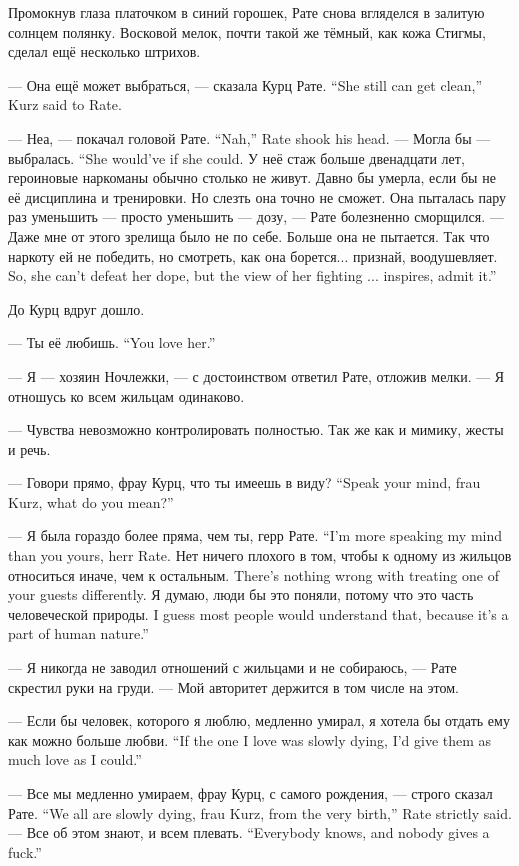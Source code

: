 Промокнув глаза платочком в синий горошек, Рате снова вгляделся в залитую солнцем полянку.
Восковой мелок, почти такой же тёмный, как кожа Стигмы, сделал ещё несколько штрихов.

{--- Она ещё может выбраться, --- сказала Курц Рате.}
{``She still can get clean,'' Kurz said to Rate.}

{--- Неа, --- покачал головой Рате.}
{``Nah,'' Rate shook his head.}
{--- Могла бы --- выбралась.}
{``She would've if she could.}
У неё стаж больше двенадцати лет, героиновые наркоманы обычно столько не живут.
Давно бы умерла, если бы не её дисциплина и тренировки.
Но слезть она точно не сможет.
Она пыталась пару раз уменьшить --- просто уменьшить --- дозу, --- Рате болезненно сморщился.
--- Даже мне от этого зрелища было не по себе.
Больше она не пытается.
{Так что наркоту ей не победить, но смотреть, как она борется... признай, воодушевляет.}
{So, she can't defeat her dope, but the view of her fighting ... inspires, admit it.''}

До Курц вдруг дошло.

{--- Ты её любишь.}
{``You love her.''}

--- Я --- хозяин Ночлежки, --- с достоинством ответил Рате, отложив мелки.
--- Я отношусь ко всем жильцам одинаково.

--- Чувства невозможно контролировать полностью.
Так же как и мимику, жесты и речь.

{--- Говори прямо, фрау Курц, что ты имеешь в виду?}
{``Speak your mind, frau Kurz, what do you mean?''}

{--- Я была гораздо более пряма, чем ты, герр Рате.}
{``I'm more speaking my mind than you yours, herr Rate.}
{Нет ничего плохого в том, чтобы к одному из жильцов относиться иначе, чем к остальным.}
{There's nothing wrong with treating one of your guests differently.}
{Я думаю, люди бы это поняли, потому что это часть человеческой природы.}
{I guess most people would understand that, because it's a part of human nature.''}

--- Я никогда не заводил отношений с жильцами и не собираюсь, --- Рате скрестил руки на груди.
--- Мой авторитет держится в том числе на этом.

{--- Если бы человек, которого я люблю, медленно умирал, я хотела бы отдать ему как можно больше любви.}
{``If the one I love was slowly dying, I'd give them as much love as I could.''}

{--- Все мы медленно умираем, фрау Курц, с самого рождения, --- строго сказал Рате.}
{``We all are slowly dying, frau Kurz, from the very birth,'' Rate strictly said.}
{--- Все об этом знают, и всем плевать.}
{``Everybody knows, and nobody gives a fuck.''}

